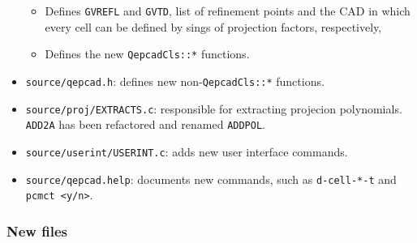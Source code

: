 \documentclass[
]{book}
\providecommand{\tightlist}{%
  \setlength{\itemsep}{0pt}\setlength{\parskip}{0pt}}
\theoremstyle{definition}
\theoremstyle{definition}
\theoremstyle{definition}
\theoremstyle{definition}
\theoremstyle{remark}
\begin{document}
\begin{itemize}
  \begin{itemize}
  \tightlist
  \item
    Defines \texttt{GVREFL} and \texttt{GVTD}, list of refinement points and the CAD in which every cell can be defined by sings of projection factors, respectively,
  \item
    Defines the new \texttt{QepcadCls::*} functions.
  \end{itemize}
\item
  \texttt{source/qepcad.h}: defines new non-\texttt{QepcadCls::*} functions.
\item
  \texttt{source/proj/EXTRACTS.c}: responsible for extracting projecion polynomials. \texttt{ADD2A} has been refactored and renamed \texttt{ADDPOL}.
\item
  \texttt{source/userint/USERINT.c}: adds new user interface commands.
\item
  \texttt{source/qepcad.help}: documents new commands, such as \texttt{d-cell-*-t} and \texttt{pcmct\ \textless{}y/n\textgreater{}}.
\end{itemize}

\hypertarget{new-files}{%
\subsubsection{New files}\label{new-files}}
\end{document}
